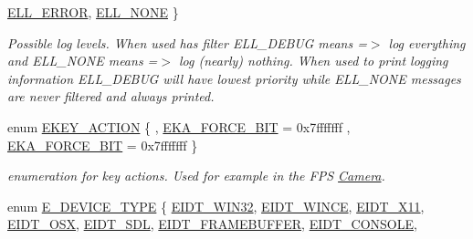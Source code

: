 \begin{DoxyCompactItemize}
\hyperlink{namespaceirr_aa2d1cac68606a25ed24cfffccfa30a92a702f1169109f7c4e2d5551a542fb333c}{E\+L\+L\+\_\+\+E\+R\+R\+OR}, 
\hyperlink{namespaceirr_aa2d1cac68606a25ed24cfffccfa30a92a1756c34c5b4a66210560fc5ade78450a}{E\+L\+L\+\_\+\+N\+O\+NE}
 \}\begin{DoxyCompactList}\small\item\em Possible log levels. When used has filter E\+L\+L\+\_\+\+D\+E\+B\+UG means =$>$ log everything and E\+L\+L\+\_\+\+N\+O\+NE means =$>$ log (nearly) nothing. When used to print logging information E\+L\+L\+\_\+\+D\+E\+B\+UG will have lowest priority while E\+L\+L\+\_\+\+N\+O\+NE messages are never filtered and always printed. \end{DoxyCompactList}
\item 
enum \hyperlink{namespaceirr_aa9946ac9f3142f9e790ce52d59fd6168}{E\+K\+E\+Y\+\_\+\+A\+C\+T\+I\+ON} \{ , \hyperlink{namespaceirr_aa9946ac9f3142f9e790ce52d59fd6168a8329ce2269a20c9da94c54bc9a2d2312}{E\+K\+A\+\_\+\+F\+O\+R\+C\+E\+\_\+B\+IT} = 0x7fffffff
, \hyperlink{namespaceirr_aa9946ac9f3142f9e790ce52d59fd6168a8329ce2269a20c9da94c54bc9a2d2312}{E\+K\+A\+\_\+\+F\+O\+R\+C\+E\+\_\+B\+IT} = 0x7fffffff
 \}\begin{DoxyCompactList}\small\item\em enumeration for key actions. Used for example in the F\+PS \hyperlink{classCamera}{Camera}. \end{DoxyCompactList}
\item 
enum \hyperlink{namespaceirr_ac25d94cf2e1037c7ca18ee79b3bd4505}{E\+\_\+\+D\+E\+V\+I\+C\+E\+\_\+\+T\+Y\+PE} \{ \newline
\hyperlink{namespaceirr_ac25d94cf2e1037c7ca18ee79b3bd4505a74a0f53e26d1051bd9ca4c2037dbb537}{E\+I\+D\+T\+\_\+\+W\+I\+N32}, 
\hyperlink{namespaceirr_ac25d94cf2e1037c7ca18ee79b3bd4505af6fa37cd50bdb3f9a034eb3e57123af5}{E\+I\+D\+T\+\_\+\+W\+I\+N\+CE}, 
\hyperlink{namespaceirr_ac25d94cf2e1037c7ca18ee79b3bd4505a8dd561e331ff4f323f44747d3fb35bb5}{E\+I\+D\+T\+\_\+\+X11}, 
\hyperlink{namespaceirr_ac25d94cf2e1037c7ca18ee79b3bd4505a7c8df4ef15bda4b4b11b83734e3be0b6}{E\+I\+D\+T\+\_\+\+O\+SX}, 
\newline
\hyperlink{namespaceirr_ac25d94cf2e1037c7ca18ee79b3bd4505a62b34998421801536f4ae49476f69be2}{E\+I\+D\+T\+\_\+\+S\+DL}, 
\hyperlink{namespaceirr_ac25d94cf2e1037c7ca18ee79b3bd4505af7aa11b07722db344ccaf08f9a3d2e6f}{E\+I\+D\+T\+\_\+\+F\+R\+A\+M\+E\+B\+U\+F\+F\+ER}, 
\hyperlink{namespaceirr_ac25d94cf2e1037c7ca18ee79b3bd4505a0d68abff77029bb1614af7eab7e25e89}{E\+I\+D\+T\+\_\+\+C\+O\+N\+S\+O\+LE}, 

\end{DoxyCompactItemize}
